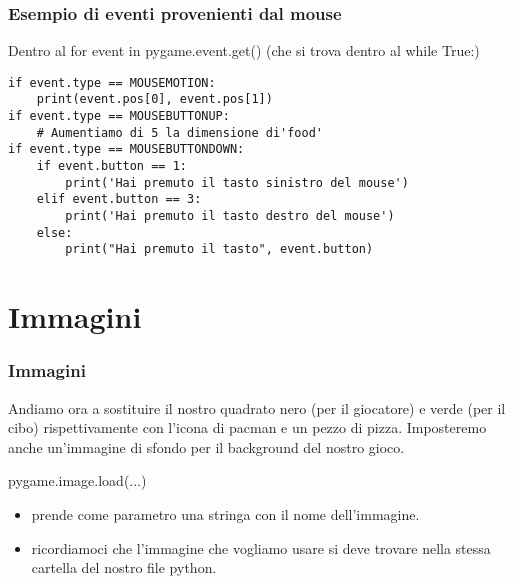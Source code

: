 \documentclass{beamer}
\begin{document}
\begin{frame}[fragile]
\frametitle{Esempio di eventi provenienti dal mouse}
Dentro al for event in pygame.event.get() (che si trova dentro al while True:)
\begin{lstlisting}
if event.type == MOUSEMOTION:
    print(event.pos[0], event.pos[1])
if event.type == MOUSEBUTTONUP:
    # Aumentiamo di 5 la dimensione di'food'
if event.type == MOUSEBUTTONDOWN:
    if event.button == 1:
        print('Hai premuto il tasto sinistro del mouse')
    elif event.button == 3:
        print('Hai premuto il tasto destro del mouse')
    else:
        print("Hai premuto il tasto", event.button)
\end{lstlisting}
\end{frame}

\section{Immagini}

\begin{frame}[fragile]
\frametitle{Immagini}
    Andiamo ora a sostituire il nostro quadrato nero (per il giocatore) e verde (per il cibo) rispettivamente con l'icona di pacman e un pezzo di pizza.
    Imposteremo anche un'immagine di sfondo per il background del nostro gioco.
    
    \begin{block}{pygame.image.load(...)}
        \begin{itemize}
            \item prende come parametro una stringa con il nome dell'immagine.
            \item ricordiamoci che l'immagine che vogliamo usare si deve trovare nella stessa cartella del nostro file python.
        \end{itemize}
    \end{block}
\end{frame}
\end{document}
